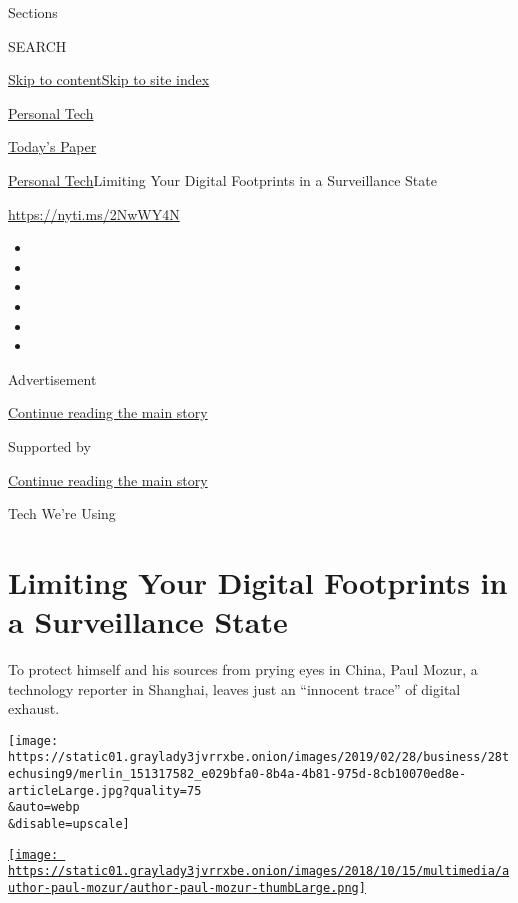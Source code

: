 Sections

SEARCH

\protect\hyperlink{site-content}{Skip to
content}\protect\hyperlink{site-index}{Skip to site index}

\href{https://www.nytimes3xbfgragh.onion/section/technology/personaltech}{Personal
Tech}

\href{https://myaccount.nytimes3xbfgragh.onion/auth/login?response_type=cookie\&client_id=vi}{}

\href{https://www.nytimes3xbfgragh.onion/section/todayspaper}{Today's
Paper}

\href{/section/technology/personaltech}{Personal Tech}\textbar{}Limiting
Your Digital Footprints in a Surveillance State

\href{https://nyti.ms/2NwWY4N}{https://nyti.ms/2NwWY4N}

\begin{itemize}
\item
\item
\item
\item
\item
\item
\end{itemize}

Advertisement

\protect\hyperlink{after-top}{Continue reading the main story}

Supported by

\protect\hyperlink{after-sponsor}{Continue reading the main story}

Tech We're Using

\hypertarget{limiting-your-digital-footprints-in-a-surveillance-state}{%
\section{Limiting Your Digital Footprints in a Surveillance
State}\label{limiting-your-digital-footprints-in-a-surveillance-state}}

To protect himself and his sources from prying eyes in China, Paul
Mozur, a technology reporter in Shanghai, leaves just an ``innocent
trace'' of digital exhaust.

\texttt{[image: https://static01.graylady3jvrrxbe.onion/images/2019/02/28/business/28techusing9/merlin\_151317582\_e029bfa0-8b4a-4b81-975d-8cb10070ed8e-articleLarge.jpg?quality=75\\\&auto=webp\\\&disable=upscale]}

\href{https://www.nytimes3xbfgragh.onion/by/paul-mozur}{\texttt{[image: https://static01.graylady3jvrrxbe.onion/images/2018/10/15/multimedia/author-paul-mozur/author-paul-mozur-thumbLarge.png]}}

